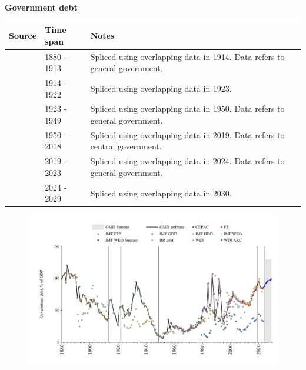 \documentclass[12pt,a4paper,landscape]{article}
\begin{document}
\begin{adjustbox}{max totalsize={\paperwidth}{\paperheight},center}
\begin{minipage}[t][\textheight][t]{\textwidth}
\vspace*{0.5cm}
{}
\begin{center}
{\Large\bfseries Government debt}
\end{center}
\vspace{0.5cm}
\begin{table}[H]
\centering
\small
\begin{tabular}{|l|l|l|}
\hline
\textbf{Source} & \textbf{Time span} & \textbf{Notes} \\
\hline
\rowcolor{white}\cite{IMF_FPP}& 1880 - 1913 &Spliced using overlapping data in 1914. Data refers to general government.\\
\rowcolor{lightgray}\cite{RR_debt}& 1914 - 1922 &Spliced using overlapping data in 1923. \\
\rowcolor{white}\cite{IMF_FPP}& 1923 - 1949 &Spliced using overlapping data in 1950. Data refers to general government.\\
\rowcolor{lightgray}\cite{IMF_GDD}& 1950 - 2018 &Spliced using overlapping data in 2019. Data refers to central government.\\
\rowcolor{white}\cite{IMF_FPP}& 2019 - 2023 &Spliced using overlapping data in 2024. Data refers to general government.\\
\rowcolor{lightgray}\cite{IMF_WEO_forecast}& 2024 - 2029 &Spliced using overlapping data in 2030. \\
\hline
\end{tabular}
\end{table}
\begin{figure}[H]
\centering
\includegraphics[width=\textwidth,height=0.6\textheight,keepaspectratio]{graphs/BRA_govdebt_GDP.pdf}
\end{figure}
\end{minipage}
\end{adjustbox}
\end{document}
